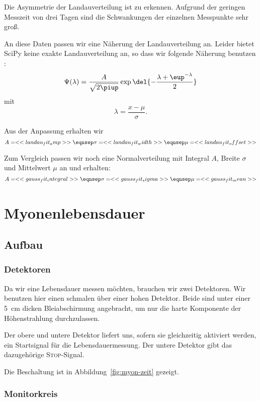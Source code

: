 \documentclass[11pt, ngerman, fleqn, DIV=15, headinclude, BCOR=2cm]{scrreprt}
\begin{document}
Die Asymmetrie der Landauverteilung ist zu erkennen. Aufgrund der geringen
Messzeit von drei Tagen sind die Schwankungen der einzelnen Messpunkte sehr groß.

An diese Daten passen wir eine Näherung der Landauverteilung an. Leider bietet
SciPy keine exakte Landauverteilung an, so dass wir folgende Näherung benutzen
\parencite{Bock/Landau_Distribution}:
\[
    \Psi(\lambda) = \frac{A}{\sqrt{2\piup}} \exp\del{
        - \frac{\lambda + \eup^{-\lambda}}2
    }
\]
mit
\[
    \lambda = \frac{x - \mu}\sigma.
\]

Aus der Anpassung erhalten wir 
\[
    A = << landau_fit_amp >>
    \eqnsep
    \sigma = << landau_fit_width >>
    \eqnsep
    \mu = << landau_fit_offset >>
\]

Zum Vergleich passen wir noch eine Normalverteilung mit Integral $A$, Breite
$\sigma$ und Mittelwert $\mu$ an und erhalten:
\[
    A = << gauss_fit_integral >>
    \eqnsep
    \sigma = << gauss_fit_sigma >>
    \eqnsep
    \mu = << gauss_fit_mean >>
\]

\chapter{Myonenlebensdauer}

\section{Aufbau}

\subsection{Detektoren}

Da wir eine Lebensdauer messen möchten, brauchen wir zwei Detektoren. Wir
benutzen hier einen schmalen über einer hohen Detektor. Beide sind unter einer
\SI{5}{\centi\meter} dicken Bleiabschirmung angebracht, um nur die harte
Komponente der Höhenstrahlung durchzulassen.

Der obere und untere Detektor liefert uns, sofern sie gleichzeitig aktiviert
werden, ein Startsignal für die Lebensdauermessung. Der untere Detektor gibt
das dazugehörige \textsc{Stop}-Signal.

Die Beschaltung ist in Abbildung~\ref{fig:myon-zeit} gezeigt.

\subsection{Monitorkreis}
\end{document}
